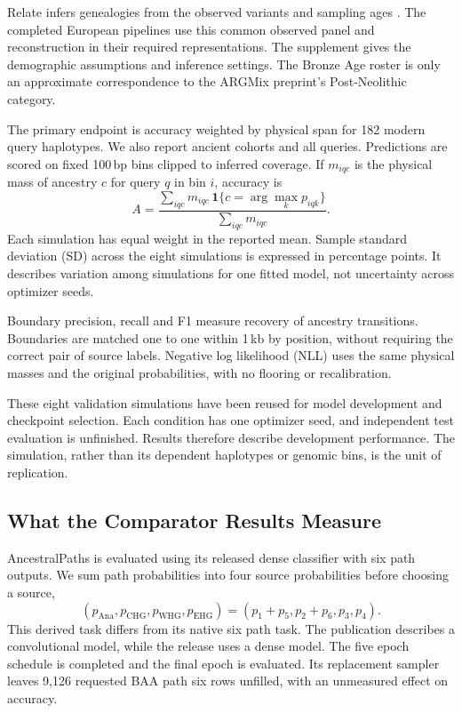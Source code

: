\documentclass[letterpaper]{article}
\begin{document}
Relate infers genealogies from the observed variants and sampling ages \citep{relate2019}. The completed European pipelines use this common observed panel and reconstruction in their required representations. The supplement gives the demographic assumptions and inference settings. The Bronze Age roster is only an approximate correspondence to the ARGMix preprint's Post-Neolithic category.

The primary endpoint is accuracy weighted by physical span for 182 modern query haplotypes. We also report ancient cohorts and all queries. Predictions are scored on fixed 100\,bp bins clipped to inferred coverage. If $m_{iqc}$ is the physical mass of ancestry $c$ for query $q$ in bin $i$, accuracy is
\begin{equation}
A=
\frac{\sum_{iqc}m_{iqc}\,
\mathbf{1}\{c=\arg\max_k p_{iqk}\}}
{\sum_{iqc}m_{iqc}}.
\end{equation}
Each simulation has equal weight in the reported mean. Sample standard deviation (SD) across the eight simulations is expressed in percentage points. It describes variation among simulations for one fitted model, not uncertainty across optimizer seeds.

Boundary precision, recall and F1 measure recovery of ancestry transitions. Boundaries are matched one to one within 1\,kb by position, without requiring the correct pair of source labels. Negative log likelihood (NLL) uses the same physical masses and the original probabilities, with no flooring or recalibration.

These eight validation simulations have been reused for model development and checkpoint selection. Each condition has one optimizer seed, and independent test evaluation is unfinished. Results therefore describe development performance. The simulation, rather than its dependent haplotypes or genomic bins, is the unit of replication.

\subsection{What the Comparator Results Measure}
AncestralPaths is evaluated using its released dense classifier with six path outputs. We sum path probabilities into four source probabilities before choosing a source,
\begin{equation}
(p_{\mathrm{Ana}},p_{\mathrm{CHG}},p_{\mathrm{WHG}},p_{\mathrm{EHG}})
=(p_1+p_5,p_2+p_6,p_3,p_4).
\end{equation}
This derived task differs from its native six path task. The publication describes a convolutional model, while the release uses a dense model. The five epoch schedule is completed and the final epoch is evaluated. Its replacement sampler leaves 9,126 requested BAA path six rows unfilled, with an unmeasured effect on accuracy.
\end{document}
